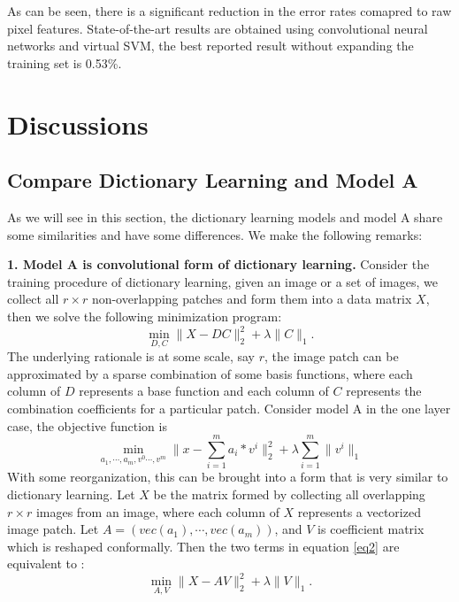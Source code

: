 \documentclass[a4paper]{article}
\begin{document}
As can be seen, there is a significant reduction in the error rates comapred to raw pixel features. State-of-the-art results are obtained using convolutional neural networks and virtual SVM, the best reported result without expanding the training set is 0.53\%.
\section{Discussions}
\subsection{Compare Dictionary Learning and Model A}
As we will see in this section, the dictionary learning models and model A share some similarities and have some differences. We make the following remarks: 

\textbf{1. Model A is convolutional form of dictionary learning.} Consider the training procedure of dictionary learning, given an image or a set of images, we collect all $r\times r$ non-overlapping patches and form them into a data matrix $X$, then we solve the following minimization program:
\begin{equation}
\min_{D,C} \|X-DC\|_2^2 + \lambda\|C\|_1.
\end{equation}
The underlying rationale is at some scale, say $r$, the image patch can be approximated by a sparse combination of some basis functions, where each column of $D$ represents a base function and each column of $C$ represents the combination coefficients for a particular patch.
Consider model A in the one layer case, the objective function is 
\begin{equation}
\label{eq2}
\min_{a_1,\cdots,a_m,v^{0}\cdots ,v^{m}} \|x-\sum_{i=1}^{m} a_i*v^{i}\|_2^2 +\lambda \sum_{i=1}^{m} \|v^{i}\|_1
\end{equation}
With some reorganization, this can be brought into a form that is very similar to dictionary learning. Let $X$ be the matrix formed by collecting all overlapping $r\times r$ images from an image, where each column of $X$ represents a vectorized image patch. Let $A=(vec(a_1),\cdots, vec(a_m))$, and $V$ is coefficient matrix which is reshaped conformally. Then the two terms in equation \eqref{eq2} are equivalent to :
\begin{equation}
\min_{A,V} \|X-AV\|_2^2+\lambda \|V\|_1.
\end{equation}
\end{document}
